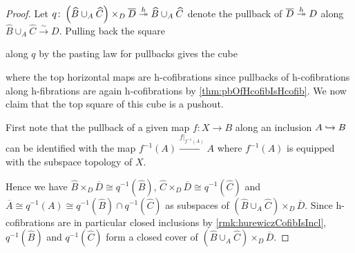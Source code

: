 \begin{prop}
\begin{proof}
        Let $q\colon\left(\widehat{B}\cup_A\widehat{C}\right)\times_{D}\overline{D}\xtwoheadrightarrow{h}\widehat{B}\cup_A\widehat{C}$ denote the pullback of $\overline{D}\xtwoheadrightarrow{h} D$ along $\widehat{B}\cup_A\widehat{C}\xrightarrow{\sim} D$.
        Pulling back the square 
        \begin{center}
        \end{center}
        along $q$ by the pasting law for pullbacks gives the cube
        \begin{center}
        \end{center}
        where the top horizontal maps are h-cofibrations since pullbacks of h-cofibrations along h-fibrations are again h-cofibrations by \cref{thm:pbOfHcofibIsHcofib}.
        We now claim that the top square of this cube is a pushout.

        First note that the pullback of a given map $f\colon X\to B$ along an inclusion $A\xhookrightarrow{} B$ can be identified with the map $f^{-1}(A)\xrightarrow{f|_{f^{-1}(A)}}A$ where $f^{-1}(A)$ is equipped with the subspace topology of $X$. 
        
        Hence we have $\widehat{B}\times_{D}\overline{D}\cong q^{-1}(\widehat{B})$, $\widehat{C}\times_{D}\overline{D}\cong q^{-1}(\widehat{C})$ and $\overline{A}\cong q^{-1}(A)\cong q^{-1}(\widehat{B})\cap q^{-1}(\widehat{C})$ as subspaces of $\left(\widehat{B}\cup_A\widehat{C}\right)\times_{D}\overline{D}$.
        Since h-cofibrations are in particular closed inclusions by \cref{rmk:hurewiczCofibIsIncl}, $q^{-1}(\widehat{B})$ and $q^{-1}(\widehat{C})$ form a closed cover of $\left(\widehat{B}\cup_A\widehat{C}\right)\times_{D}\overline{D}$.
        

\end{proof}
\end{prop}
